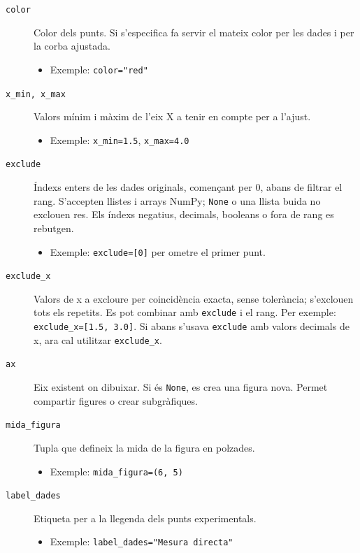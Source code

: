 \documentclass[11pt,a4paper]{article}
\begin{document}
\begin{description}
  \item[\texttt{color}] Color dels punts. Si s'especifica fa servir el mateix color per les dades i per la corba ajustada.
    \begin{itemize}
      \item Exemple: \texttt{color="red"} 
    \end{itemize}

  \item[\texttt{x\_min, x\_max}] Valors mínim i màxim de l’eix X a tenir en compte per a l’ajust.
    \begin{itemize}
      \item Exemple: \texttt{x\_min=1.5}, \texttt{x\_max=4.0}
    \end{itemize}

  \item[\texttt{exclude}] Índexs enters de les dades originals, començant per 0, abans de filtrar el rang. S'accepten llistes i arrays NumPy; \texttt{None} o una llista buida no exclouen res. Els índexs negatius, decimals, booleans o fora de rang es rebutgen.
    \begin{itemize}
      \item Exemple: \texttt{exclude=[0]} per ometre el primer punt.
    \end{itemize}

  \item[\texttt{exclude\_x}] Valors de x a excloure per coincidència exacta,
    sense tolerància; s'exclouen tots els repetits. Es pot combinar amb
    \texttt{exclude} i el rang. Per exemple: \texttt{exclude\_x=[1.5, 3.0]}.
    Si abans s'usava \texttt{exclude} amb valors decimals de x, ara cal
    utilitzar \texttt{exclude\_x}.

  \item[\texttt{ax}] Eix existent on dibuixar. Si és \texttt{None}, es crea una
    figura nova. Permet compartir figures o crear subgràfiques.

  \item[\texttt{mida\_figura}] Tupla que defineix la mida de la figura en polzades.
    \begin{itemize}
      \item Exemple: \texttt{mida\_figura=(6, 5)}
    \end{itemize}

  \item[\texttt{label\_dades}] Etiqueta per a la llegenda dels punts experimentals.
    \begin{itemize}
      \item Exemple: \texttt{label\_dades="Mesura directa"}
    \end{itemize}


\end{description}
\end{document}
